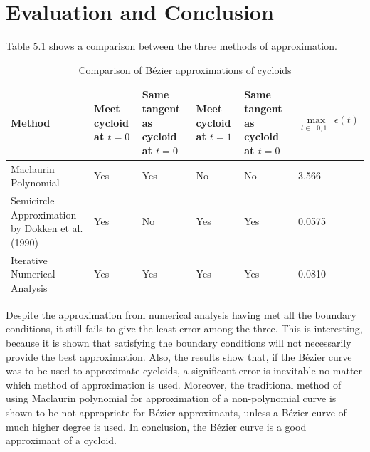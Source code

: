 \documentclass[12pt, oneside, appendixprefix=Appendix]{article}
\theoremstyle{definition}
\numberwithin{figure}{section}
\begin{document}
\section{Evaluation and Conclusion}

Table 5.1 shows a comparison between the three methods of approximation.

\begin{table}[H]
\begin{center}
    \begin{tabular}{m{2.6cm} | m{2cm} | m{2.1cm} | m{2cm} | m{2.1cm} | m{1.7cm}}
    \toprule
    Method & Meet cycloid at $t=0$ & Same tangent as cycloid at $t=0$ & Meet cycloid at $t=1$ & Same tangent as cycloid at $t=0$ & $\max\limits_{t \in [0, 1]} \epsilon (t)$ \\
    \toprule
    Maclaurin Polynomial & Yes & Yes & No & No & 3.566 \\
    \midrule
    Semicircle Approximation by Dokken et al. (1990) & Yes & No & Yes & Yes & 0.0575 \\
    \midrule
    Iterative Numerical Analysis & Yes & Yes & Yes & Yes & 0.0810 \\
    \bottomrule
    \end{tabular}
\end{center}
\caption{Comparison of B\'ezier approximations of cycloids}
\end{table}

Despite the approximation from numerical analysis having met all the boundary conditions, it still fails to give the least error among the three. This is interesting, because it is shown that satisfying the boundary conditions will not necessarily provide the best approximation. Also, the results show that, if the B\'ezier curve was to be used to approximate cycloids, a significant error is inevitable no matter which method of approximation is used. Moreover, the traditional method of using Maclaurin polynomial for approximation of a non-polynomial curve is shown to be not appropriate for B\'ezier approximants, unless a B\'ezier curve of much higher degree is used. In conclusion, the B\'ezier curve is a good approximant of a cycloid.

\newpage




\newpage
\end{document}
